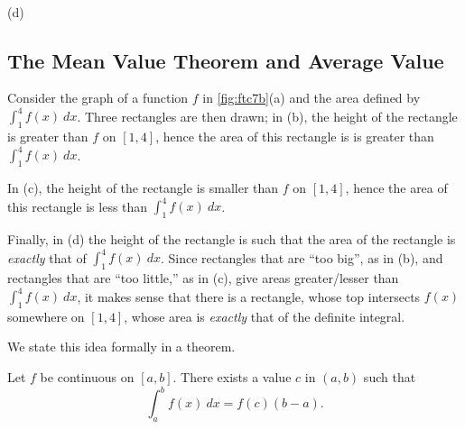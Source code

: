 {
\\(d)}

\subsection{The Mean Value Theorem and Average Value}

Consider the graph of a function $f$ in \autoref{fig:ftc7b}(a) and the area defined by $\int_1^4 f(x)\ dx$. Three rectangles are then drawn; in (b), the height of the rectangle is greater than $f$ on $[1,4]$, hence the area of this rectangle is is greater than $\int_1^4 f(x)\ dx$. 

In (c), the height of the rectangle is smaller than $f$ on $[1,4]$, hence the area of this rectangle is less than $\int_1^4 f(x)\ dx$.

Finally, in (d) the height of the rectangle is such that the area of the rectangle is \emph{exactly} that of $\int_1^4 f(x)\ dx$. Since rectangles that are ``too big\primeskip'', as in (b), and rectangles that are ``too little,'' as in (c), give areas greater/lesser than $\int_1^4 f(x)\ dx$, it makes sense that there is a rectangle, whose top intersects $f(x)$ somewhere on $[1,4]$, whose area is \emph{exactly} that of the definite integral.

We state this idea formally in a theorem.

\begin{theorem}\label{thm:mvt2}
Let $f$ be continuous on $[a,b]$. There exists a value $c$ in $(a,b)$ such that
\[\int_a^bf(x)\ dx = f(c)(b-a).\]
\end{theorem}

